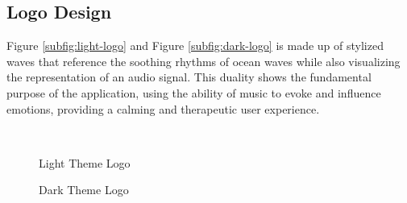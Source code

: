 \subsection{Logo Design}
Figure \ref{subfig:light-logo} and Figure \ref{subfig:dark-logo} is made up of stylized waves that reference the soothing rhythms of ocean waves while also visualizing the representation of an audio signal.
This duality shows the fundamental purpose of the application, using the ability of music to evoke and influence emotions, providing a calming and therapeutic user experience.
\begin{figure}[h!]
    \centering
    \qquad
    \vspace{0.5cm}
    \\
    \caption{Light Theme Logo}
\end{figure}
\begin{figure}[h!]
    \centering
    \caption{Dark Theme Logo}
\end{figure}
